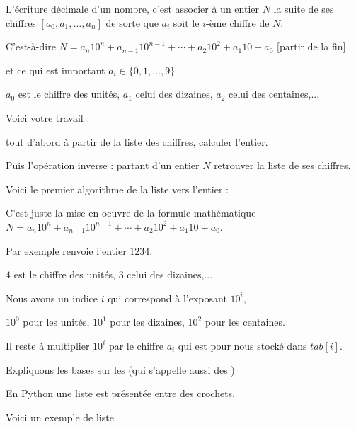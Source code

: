 L'écriture décimale d'un nombre, c'est associer à un entier $N$
la suite de ses chiffres $[a_0,a_1,\ldots,a_n]$ de sorte que $a_i$ soit le $i$-ème chiffre
de $N$.

\change

 C'est-à-dire 
$N= a_n 10^n+ a_{n-1}10^{n-1}+\cdots + a_2 10^2 + a_1 10 + a_0$
[partir de la fin]

et ce qui est important $a_i \in \{0,1,\ldots,9\}$

\change

$a_0$ est le chiffre des unités, $a_1$ celui des dizaines, $a_2$ celui des centaines,...

\change

Voici votre travail :

tout d'abord à partir de la liste des chiffres, calculer l'entier.

Puis l'opération inverse : partant d'un entier $N$ retrouver la liste de ses chiffres.



\diapo

Voici le premier algorithme de la liste vers l'entier :

\change

C'est juste la mise en oeuvre de la formule mathématique 
$N= a_n 10^n+ a_{n-1}10^{n-1}+\cdots + a_2 10^2 + a_1 10 + a_0$.

\change

Par exemple  renvoie l'entier $1234$.

$4$ est le chiffre des unités, $3$ celui des dizaines,...

Nous avons un indice $i$ qui correspond à l'exposant $10^i$,

$10^0$ pour les unités, $10^1$ pour les dizaines, $10^2$ pour les centaines.

Il reste à multiplier $10^i$ par le chiffre $a_i$ qui est pour nous stocké dans $tab[i]$.



\diapo

Expliquons les bases sur les  (qui s'appelle aussi des )

 En Python une liste est présentée entre des crochets.
 
 
\change

Voici un exemple de liste 

